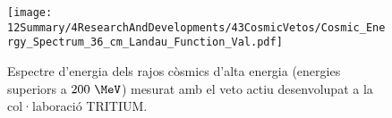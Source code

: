 \begin{enumerate}
\begin{figure}[h]
\texttt{[image: 12Summary/4ResearchAndDevelopments/43CosmicVetos/Cosmic\_Energy\_Spectrum\_36\_cm\_Landau\_Function\_Val.pdf]}
\centering
\caption{Espectre d'energia dels rajos còsmics d'alta energia (energies superiors a $200~\MeV$) mesurat amb el veto actiu desenvolupat a la col·laboració TRITIUM\label{fig:EspectreEnergeticVetoActiu}.}
\end{figure}

\end{enumerate} 